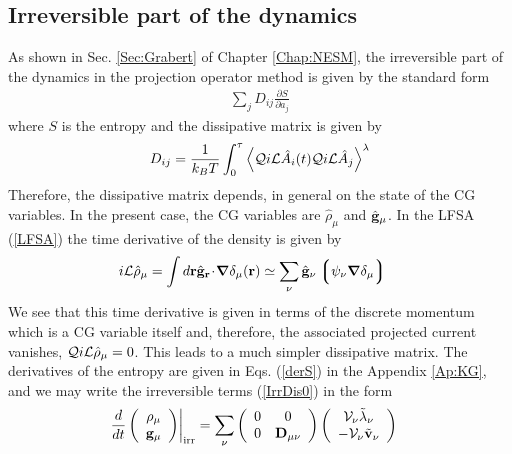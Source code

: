 \documentclass[b5paper,openright,11pt]{book}
\newcommand{\esc}{\!\cdot\!}
\newcommand{\llangle}{\left\langle}
\newcommand{\rrangle}{\right\rangle}
\newcommand{\llg}{\left\lgroup}
\newcommand{\rlg}{\right\rgroup}
\begin{document}
\subsection{Irreversible part of the dynamics}
As shown in  Sec. \ref{Sec:Grabert} of Chapter  \ref{Chap:NESM}, the  irreversible part of the
dynamics in  the projection operator  method is given by  the standard
form
\begin{align}
  \sum_jD_{ij}\frac{\partial S}{\partial a_j}
\label{IrrDis0}
\end{align}
where $S$ is the entropy and the dissipative matrix is given by
\begin{align}
  D_{ij}=\frac{1}{k_BT}\int_0^\tau\llangle {\cal Q}i{\cal L}\hat{A}_i(t){\cal Q}i{\cal L}\hat{A}_j\rrangle^{\lambda}
\end{align}
Therefore,  the dissipative  matrix  depends,  in
general on the state of the CG variables.  In the present case, the CG
variables are $\hat{\rho}_\mu$ and $\hat{\bf g}_\mu$.   In the
LFSA (\ref{LFSA}) the time derivative of the density is given by
\begin{align}
  i{\cal L}\hat{\rho}_\mu &=\int d{\bf r}\hat{\bf g}_{\bf r} \esc\boldsymbol{\nabla}\delta_\mu({\bf r})
\simeq \sum_\nu\hat{\bf g}_\nu \llg\psi_\nu\boldsymbol{\nabla}\delta_\mu\rlg
\end{align}
We see  that this time  derivative is given  in terms of  the discrete
momentum which is a CG  variable itself and, therefore, the associated
projected  current vanishes,  ${\cal Q}i{\cal  L}\hat{\rho}_\mu =0$.
This leads to a much simpler dissipative matrix.
The derivatives of the entropy are  given in Eqs.  (\ref{derS}) in the
Appendix \ref{Ap:KG}, and we  may write the irreversible  terms (\ref{IrrDis0}) in
the form
\begin{align}
\left.\frac{d}{dt}\left(\begin{array}{c}
\rho_\mu\\
{\bf g}_\mu
\end{array}\right)\right|_{\rm irr}
&=\sum_\nu\left(\begin{array}{cc}
0&0\\
0&{\bf D}_{\mu\nu}
\end{array}\right)\left(
\begin{array}{c}
{\cal V}_\nu \tilde{\lambda}_\nu\\
-{\cal V}_\nu \tilde{\bf v}_\nu
\end{array}\right)
\label{IrrDis}
\end{align}
\end{document}
